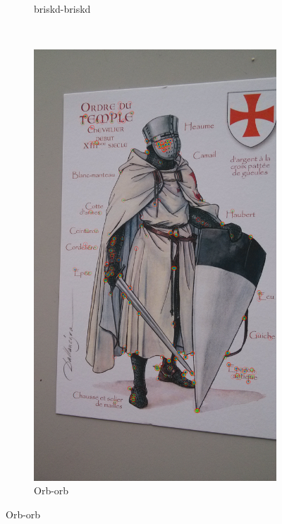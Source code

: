 \documentclass[10pt,conference,compsocconf]{IEEEtran}
\begin{document}
\begin{figure}[!ht]
\begin{subfigure}[b]{0.15\textwidth}
                \caption{briskd-briskd}
                \label{fig:b}
        \end{subfigure}%
        ~ %
        \begin{subfigure}[b]{0.15\textwidth}
                \includegraphics[width=\textwidth]{o}
                \caption{Orb-orb}
                \label{fig:o}
        \end{subfigure}

\end{figure}
\end{document}
